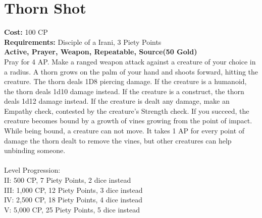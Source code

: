 \section{Thorn Shot}\label{prayer:thornShot}
\textbf{Cost:} 100 CP\\
\textbf{Requirements:} Disciple of a Irani, 3 Piety Points \\
\textbf{Active, Prayer, Weapon, Repeatable, Source(50 Gold)}\\
Pray for 4 AP. Make a ranged weapon attack against a creature of your choice in a  radius.
A thorn grows on the palm of your hand and shoots forward, hitting the creature.
The thorn deals 1D8 piercing damage.
If the creature is a humanoid, the thorn deals 1d10 damage instead.
If the creature is a construct, the thorn deals 1d12 damage instead.
If the creature is dealt any damage, make an Empathy check, contested by the creature's Strength check.
If you succeed, the creature becomes bound by a growth of vines growing from the point of impact.
While being bound, a creature can not move.
It takes 1 AP for every point of damage the thorn dealt to remove the vines, but other creatures can help unbinding someone.\\
\\
Level Progression:\\
II: 500 CP, 7 Piety Points, 2 dice instead\\
III: 1,000 CP, 12 Piety Points, 3 dice instead\\
IV: 2,500 CP, 18 Piety Points, 4 dice instead\\
V: 5,000 CP, 25 Piety Points, 5 dice instead\\